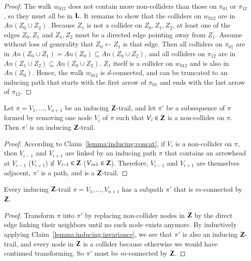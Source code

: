 \begin{proof}
The walk $w_{012}$ does not contain more non-colliders than
those on $\pi_{01}$ or $\pi_{12}$, so they must all be in ${\bf L}$.
It remains to show that the colliders on $w_{012}$ are 
in $\textit{An}(Z_0\cup Z_2)$. Because $Z_1$ is not a collider
on $Z_0,Z_1,Z_2$, at least one of the edges $Z_0,Z_1$ 
and $Z_1,Z_2$ must be a directed edge pointing away from $Z_1$. Assume
without loss of generality that $Z_0 \gets Z_1$ is that
edge. Then all colliders on $\pi_{01}$ are in 
$\textit{An}(Z_0 \cup Z_1)=\textit{An}(Z_0) \subseteq \textit{An}(Z_0 \cup Z_2)$,
and all colliders on $\pi_{12}$ are in $\textit{An}(Z_1 \cup Z_2)
\subseteq \textit{An}(Z_0 \cup Z_2)$. $Z_1$ itself is 
a collider on $w_{012}$ and is also in $\textit{An}(Z_0)$.
Hence, the walk $w_{012}$ is $d$-connected,
and can be truncated to an inducing path that starts
with the first arrow of $\pi_{01}$ and ends
with the last arrow of $\pi_{12}$.
\end{proof}



\begin{claim}
\label{lemma:inducing:invariance}
Let $\pi=V_1,\ldots,V_{n+1}$ be an inducing ${\bf Z}$-trail, 
and let $\pi'$ be a subsequence of $\pi$ formed by removing
one node $V_i$ of $\pi$ such that $V_i \in {\bf Z}$ is
a non-collider on $\pi$. Then $\pi'$ is an inducing ${\bf Z}$-trail.
\end{claim}

\begin{proof}
According to Claim~\ref{lemma:inducing:concat}, 
if $V_i$ is a non-collider on $\pi$, then $V_{i-1}$ and
$V_{i+1}$ are linked by an inducing path $\pi$ that contains
an arrowhead at $V_{i-1}$ ($V_{i+1}$) if $V_{i-1}\in{\bf Z}$ ($V_{i+1}\in{\bf Z}$).
Therefore,  $V_{i-1}$ and $V_{i+1}$ are themselves adjacent,
$\pi'$ is a path, and is a ${\bf Z}$-trail.  
\end{proof}

\begin{corollary}\label{cor:inducing:z:trail:has:subpath}
Every inducing ${\bf Z}$-trail $\pi=V_1,\ldots,V_{n+1}$
has a subpath $\pi'$ that is
$m$-connected by ${\bf Z}$.
\end{corollary}

\begin{proof}
Transform $\pi$ into $\pi'$ by replacing non-collider nodes
in ${\bf Z}$ by the direct edge linking their neighbors until
no such node exists anymore. By inductively applying 
Claim~\ref{lemma:inducing:invariance}, we see that $\pi'$
is also an inducing ${\bf Z}$-trail, and 
every node in ${\bf Z}$ is a collider because otherwise we
would have continued transforming.
So $\pi'$ must be $m$-connected by ${\bf Z}$.
\end{proof}

